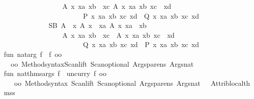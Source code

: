 \begin{isabellebody}
\ \ \ \ \ \ \ \ \ \ \ \ \ \ \ \ \ {\isacharquery}A{}\ x\ xa\ xb\ {\isachartilde}{\isachartilde}{\isachargreater}\ xc{\isacharcomma}\ {\isacharquery}A{}\ x\ xa\ xb\ xc\ {\isachartilde}{\isachartilde}{\isachargreater}\ xd{\isachardot}\ \isanewline
\ \ \ \ \ \ \ \ \ \ \ \ \ \ \ \ \ \ \ \ \ \ \ {\isacharquery}P{}\ x\ xa\ xb\ xc\ xd\ {\isacharslash}{\isacharbackslash}{\isacharbackslash}{\isacharbackslash}{\isacharbackslash}\ {\isacharquery}Q{}\ x\ xa\ xb\ xc\ xd{\isacharparenright}\ {\isacharequal}\isanewline
\ \ \ \ \ \ \ \ \ \ \ \ \ {\isacharparenleft}SB\ {\isacharquery}A\ {\isachartilde}{\isachartilde}{\isachargreater}\ x{\isacharcomma}\ {\isacharquery}A{}\ x\ {\isachartilde}{\isachartilde}{\isachargreater}\ xa{\isacharcomma}\ {\isacharquery}A{}\ x\ xa\ {\isachartilde}{\isachartilde}{\isachargreater}\ xb{\isacharcomma}\isanewline
\ \ \ \ \ \ \ \ \ \ \ \ \ \ \ \ \ {\isacharquery}A{}\ x\ xa\ xb\ {\isachartilde}{\isachartilde}{\isachargreater}\ xc{\isacharcomma}\ \ {\isacharquery}A{}\ x\ xa\ xb\ xc\ {\isachartilde}{\isachartilde}{\isachargreater}\ xd{\isachardot}\ \isanewline
\ \ \ \ \ \ \ \ \ \ \ \ \ \ \ \ \ \ \ \ \ \ \ {\isacharquery}Q{}\ x\ xa\ xb\ xc\ xd\ {\isacharslash}{\isacharbackslash}{\isacharbackslash}{\isacharbackslash}{\isacharbackslash}\ {\isacharquery}P{}\ x\ xa\ xb\ xc\ xd{\isacharparenright}{\isachardoublequote}\ {\isacharasterisk}{\isacharparenright}\isanewline
{\isacharverbatimclose}\isanewline
\isanewline
{}\isamarkupfalse%
{\isacharverbatimopen}\ \isanewline
\isanewline
fun\ nat{\isacharunderscore}arg\ f\ {\isacharequal}\ {\isacharparenleft}f{\isacharparenright}\ oo\isanewline
\ {\isacharparenleft}{\isacharhash}{}\ oo\ Method{\isachardot}syntax{\isacharparenleft}Scan{\isachardot}lift\ {\isacharparenleft}Scan{\isachardot}optional\ {\isacharparenleft}Args{\isachardot}parens\ Args{\isachardot}nat{\isacharparenright}\ {}{\isacharparenright}{\isacharparenright}{\isacharparenright}{\isacharsemicolon}\isanewline
\isanewline
fun\ nat{\isacharunderscore}thms{\isacharunderscore}args\ f\ {\isacharequal}\ uncurry\ f\ oo\isanewline
\ \ {\isacharparenleft}{\isacharhash}{}\ oo\ Method{\isachardot}syntax\ {\isacharparenleft}Scan{\isachardot}lift\ {\isacharparenleft}Scan{\isachardot}optional\ {\isacharparenleft}Args{\isachardot}parens\ Args{\isachardot}nat{\isacharparenright}\ {}{\isacharparenright}\ {\isacharminus}{\isacharminus}\ Attrib{\isachardot}local{\isacharunderscore}thmss{\isacharparenright}{\isacharparenright}{\isacharsemicolon}\isanewline

\end{isabellebody}
